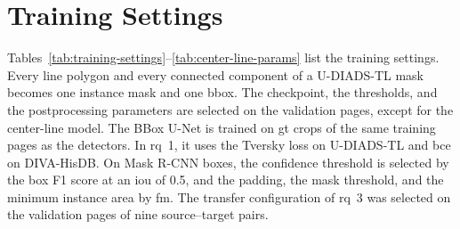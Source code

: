 \FloatBarrier
\section{Training Settings}
\label{app:training-settings}

\label{sec:training-setup}\label{sec:training-semantic}\label{sec:training-two-stage}\label{sec:training-mask-rcnn}\label{sec:training-center-line}\label{sec:training-pretraining}
Tables~\ref{tab:training-settings}--\ref{tab:center-line-params} list the training settings. Every line polygon and every connected component of a U-DIADS-TL mask becomes one instance mask and one \gls{bbox}. The checkpoint, the thresholds, and the postprocessing parameters are selected on the validation pages, except for the center-line model. The BBox U-Net is trained on \gls{gt} crops of the same training pages as the detectors. In \gls{rq}~1, it uses the Tversky loss on U-DIADS-TL and \gls{bce} on DIVA-HisDB. On Mask R-CNN boxes, the confidence threshold is selected by the box F1 score at an \gls{iou} of 0.5, and the padding, the mask threshold, and the minimum instance area by \gls{fm}. The transfer configuration of \gls{rq}~3 was selected on the validation pages of nine source--target pairs.

